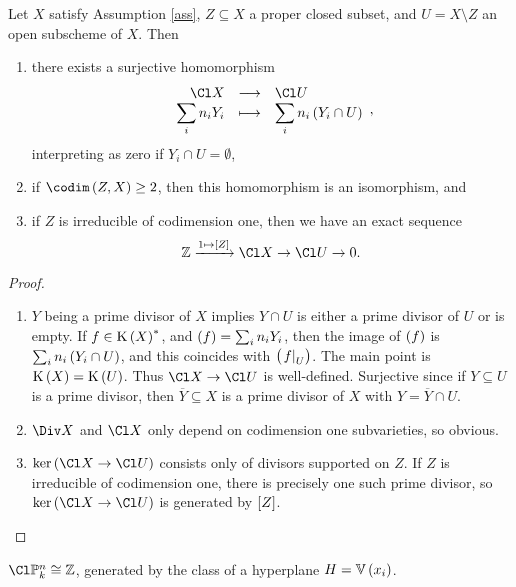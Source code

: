 
\begin{proposition}
Let $ X $ satisfy Assumption \ref{ass}, $ Z \subseteq X $ a proper closed subset, and $ U = X \setminus Z $ an open subscheme of $ X $. Then
\begin{enumerate}
\item there exists a surjective homomorphism
$$ \function{\Cl X}{\Cl U}{\sum_i n_iY_i}{\sum_i n_i\br{Y_i \cap U}}, $$
interpreting as zero if $ Y_i \cap U = \emptyset $,
\item if $ \codim\br{Z, X} \ge 2 $, then this homomorphism is an isomorphism, and
\item if $ Z $ is irreducible of codimension one, then we have an exact sequence
$$ \ZZ \xrightarrow{1 \mapsto \sbr{Z}} \Cl X \to \Cl U \to 0. $$
\end{enumerate}
\end{proposition}

\begin{proof}
\hfill
\begin{enumerate}
\item $ Y $ being a prime divisor of $ X $ implies $ Y \cap U $ is either a prime divisor of $ U $ or is empty. If $ f \in \K\br{X}^* $, and $ \br{f} = \sum_i n_iY_i $, then the image of $ \br{f} $ is $ \sum_i n_i\br{Y_i \cap U} $, and this coincides with $ \br{\eval{f}_U} $. The main point is $ \K\br{X} = \K\br{U} $. Thus $ \Cl X \to \Cl U $ is well-defined. Surjective since if $ Y \subseteq U $ is a prime divisor, then $ \overline{Y} \subseteq X $ is a prime divisor of $ X $ with $ Y = \overline{Y} \cap U $.
\item $ \Div X $ and $ \Cl X $ only depend on codimension one subvarieties, so obvious.
\item $ \ker \br{\Cl X \to \Cl U} $ consists only of divisors supported on $ Z $. If $ Z $ is irreducible of codimension one, there is precisely one such prime divisor, so $ \ker \br{\Cl X \to \Cl U} $ is generated by $ \sbr{Z} $.
\end{enumerate}
\end{proof}

\begin{proposition}
$ \Cl \PP_k^n \cong \ZZ $, generated by the class of a hyperplane $ H = \VV\br{x_i} $.
\end{proposition}

